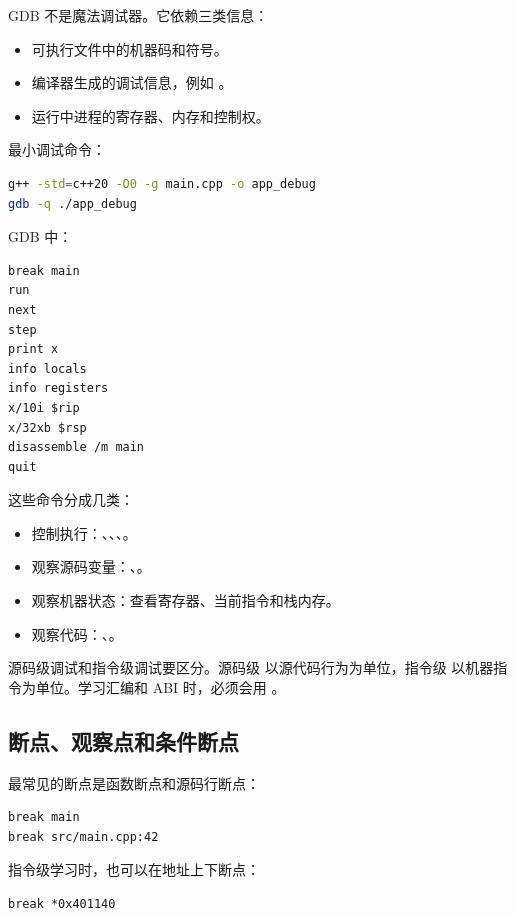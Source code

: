 GDB 不是魔法调试器。它依赖三类信息：

\begin{itemize}
  \item 可执行文件中的机器码和符号。
  \item 编译器生成的调试信息，例如 。
  \item 运行中进程的寄存器、内存和控制权。
\end{itemize}

最小调试命令：

\begin{lstlisting}[language=bash]
g++ -std=c++20 -O0 -g main.cpp -o app_debug
gdb -q ./app_debug
\end{lstlisting}

GDB 中：

\begin{lstlisting}
break main
run
next
step
print x
info locals
info registers
x/10i $rip
x/32xb $rsp
disassemble /m main
quit
\end{lstlisting}

这些命令分成几类：

\begin{itemize}
  \item 控制执行：、、、。
  \item 观察源码变量：、。
  \item 观察机器状态：查看寄存器、当前指令和栈内存。
  \item 观察代码：、。
\end{itemize}

源码级调试和指令级调试要区分。源码级  以源代码行为为单位，指令级  以机器指令为单位。学习汇编和 ABI 时，必须会用 。

\subsection{断点、观察点和条件断点}

最常见的断点是函数断点和源码行断点：

\begin{lstlisting}
break main
break src/main.cpp:42
\end{lstlisting}

指令级学习时，也可以在地址上下断点：

\begin{lstlisting}
break *0x401140
\end{lstlisting}

